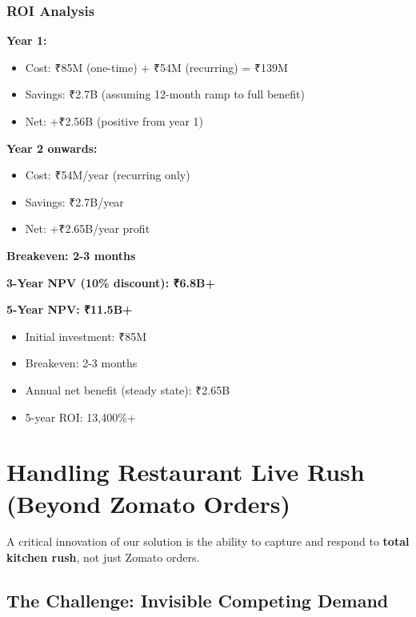 \documentclass[11pt,a4paper]{article}
\begin{document}
\subsubsection{ROI Analysis}

\textbf{Year 1:}
\begin{itemize}
    \item Cost: ₹85M (one-time) + ₹54M (recurring) = ₹139M
    \item Savings: ₹2.7B (assuming 12-month ramp to full benefit)
    \item Net: +₹2.56B (positive from year 1)
\end{itemize}

\textbf{Year 2 onwards:}
\begin{itemize}
    \item Cost: ₹54M/year (recurring only)
    \item Savings: ₹2.7B/year
    \item Net: +₹2.65B/year profit
\end{itemize}

\textbf{Breakeven: 2-3 months}

\textbf{3-Year NPV (10\% discount): ₹6.8B+}

\textbf{5-Year NPV: ₹11.5B+}

\begin{tcolorbox}[colback=lightgray,colframe=darkblue,title=\textbf{ROI Summary}]
\begin{itemize}
    \item Initial investment: ₹85M
    \item Breakeven: 2-3 months
    \item Annual net benefit (steady state): ₹2.65B
    \item 5-year ROI: 13,400\%+
\end{itemize}
\end{tcolorbox}

\newpage

\section{Handling Restaurant Live Rush (Beyond Zomato Orders)}

A critical innovation of our solution is the ability to capture and respond to \textbf{total kitchen rush}, not just Zomato orders.

\subsection{The Challenge: Invisible Competing Demand}
\end{document}
